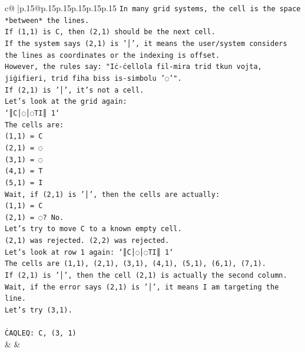 \documentclass{article}
\begin{document}
{\begin{supertabular}{c@{$\;$}|p{.15\linewidth}@{}p{.15\linewidth}p{.15\linewidth}p{.15\linewidth}p{.15\linewidth}p{.15\linewidth}}
{{{\texttt{In many grid systems, the cell is the space *between* the lines.} \\
\texttt{If (1,1) is C, then (2,1) should be the next cell.} \\
\texttt{If the system says (2,1) is '│', it means the user/system considers the lines as coordinates or the indexing is offset.} \\
\texttt{However, the rules say: "Iċ{-}ċellola fil{-}mira trid tkun vojta, jiġifieri, trid fiha biss is{-}simbolu '◌'".} \\
\texttt{If (2,1) is '│', it's not a cell.} \\
\texttt{Let's look at the grid again:} \\
\texttt{`║C│◌│◌TI║ 1`} \\
\texttt{The cells are:} \\
\texttt{(1,1) = C} \\
\texttt{(2,1) = ◌} \\
\texttt{(3,1) = ◌} \\
\texttt{(4,1) = T} \\
\texttt{(5,1) = I} \\
\texttt{Wait, if (2,1) is '│', then the cells are actually:} \\
\texttt{(1,1) = C} \\
\texttt{(2,1) = ◌? No.} \\
\texttt{Let's try to move C to a known empty cell.} \\
\texttt{(2,1) was rejected. (2,2) was rejected.} \\
\texttt{Let's look at row 1 again: `║C│◌│◌TI║ 1`} \\
\texttt{The cells are (1,1), (2,1), (3,1), (4,1), (5,1), (6,1), (7,1).} \\
\texttt{If (2,1) is '│', then the cell (2,1) is actually the second column.} \\
\texttt{Wait, if the error says (2,1) is '│', it means I am targeting the line.} \\
\texttt{Let's try (3,1).} \\
\\ 
\texttt{ĊAQLEQ: C, (3, 1)} \\
            }
        }
    }
    & & \\ \\


\end{supertabular}}
\end{document}
